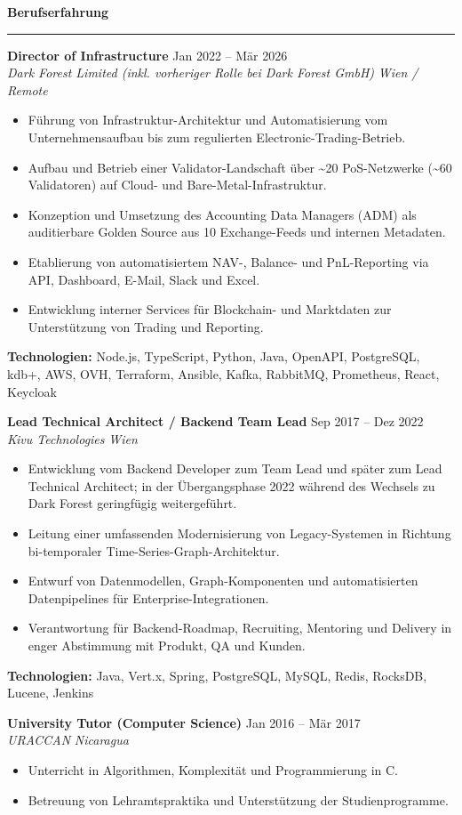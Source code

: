 \documentclass[11pt,a4paper]{article}
\newcommand{\sectionspacebefore}{0.85em}
\newcommand{\sectionspacetoline}{-0.12em}
\newcommand{\sectionspacetocontent}{0.48em}
\newcommand{\roleblockgap}{0.52em}
\newcommand{\cvsection}[1]{
  \par\vspace{\sectionspacebefore}
  {\large\bfseries\color{black}#1}\par
  \vspace{\sectionspacetoline}
  \noindent\rule{\textwidth}{0.45pt}\par
  \vspace{\sectionspacetocontent}
}
\newcommand{\role}[4]{
  \textbf{#1} \hfill #2\\
  \textit{#3} \hfill \textit{#4}
  \vspace{0.15em}
}
\begin{document}
\cvsection{Berufserfahrung}
\role{Director of Infrastructure}{Jan 2022 -- Mär 2026}{Dark Forest Limited (inkl. vorheriger Rolle bei Dark Forest GmbH)}{Wien / Remote}
\begin{itemize}
  \item Führung von Infrastruktur-Architektur und Automatisierung vom Unternehmensaufbau bis zum regulierten Electronic-Trading-Betrieb.
  \item Aufbau und Betrieb einer Validator-Landschaft über \textasciitilde20 PoS-Netzwerke (\textasciitilde60 Validatoren) auf Cloud- und Bare-Metal-Infrastruktur.
  \item Konzeption und Umsetzung des Accounting Data Managers (ADM) als auditierbare Golden Source aus 10 Exchange-Feeds und internen Metadaten.
  \item Etablierung von automatisiertem NAV-, Balance- und PnL-Reporting via API, Dashboard, E-Mail, Slack und Excel.
  \item Entwicklung interner Services für Blockchain- und Marktdaten zur Unterstützung von Trading und Reporting.
\end{itemize}
\textbf{Technologien:} Node.js, TypeScript, Python, Java, OpenAPI, PostgreSQL, kdb+, AWS, OVH, Terraform, Ansible, Kafka, RabbitMQ, Prometheus, React, Keycloak

\vspace{\roleblockgap}
\role{Lead Technical Architect / Backend Team Lead}{Sep 2017 -- Dez 2022}{Kivu Technologies}{Wien}
\begin{itemize}
  \item Entwicklung vom Backend Developer zum Team Lead und später zum Lead Technical Architect; in der Übergangsphase 2022 während des Wechsels zu Dark Forest geringfügig weitergeführt.
  \item Leitung einer umfassenden Modernisierung von Legacy-Systemen in Richtung bi-temporaler Time-Series-Graph-Architektur.
  \item Entwurf von Datenmodellen, Graph-Komponenten und automatisierten Datenpipelines für Enterprise-Integrationen.
  \item Verantwortung für Backend-Roadmap, Recruiting, Mentoring und Delivery in enger Abstimmung mit Produkt, QA und Kunden.
\end{itemize}
\textbf{Technologien:} Java, Vert.x, Spring, PostgreSQL, MySQL, Redis, RocksDB, Lucene, Jenkins

\vspace{\roleblockgap}
\role{University Tutor (Computer Science)}{Jan 2016 -- Mär 2017}{URACCAN}{Nicaragua}
\begin{itemize}
  \item Unterricht in Algorithmen, Komplexität und Programmierung in C.
  \item Betreuung von Lehramtspraktika und Unterstützung der Studienprogramme.
\end{itemize}
\end{document}

